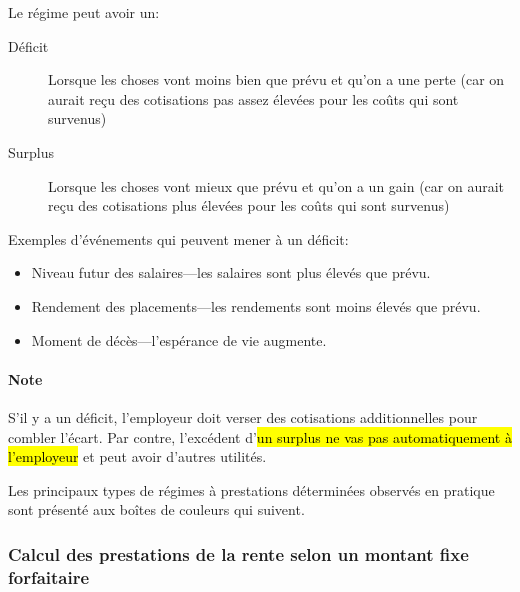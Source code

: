 \documentclass[10pt, french]{article}
\begin{document}
\begin{multicols*}{3}
\begin{definitionNOHFILLsub}
Le régime peut avoir un:
\begin{description}
	\item[Déficit]	Lorsque les choses vont moins bien que prévu et qu'on a une perte (car on aurait reçu des cotisations pas assez élevées pour les coûts qui sont survenus) 
	\item[Surplus]	Lorsque les choses vont mieux que prévu et qu'on a un gain (car on aurait reçu des cotisations plus élevées pour les coûts qui sont survenus) 
\end{description}

Exemples d'événements qui peuvent mener à un déficit:
\begin{itemize}[leftmargin = *]
	\item	Niveau futur des salaires---les salaires sont plus élevés que prévu.
	\item	Rendement des placements---les rendements sont moins élevés que prévu.
	\item	Moment de décès---l'espérance de vie augmente.
\end{itemize}


\paragraph{Note} S'il y a un déficit, l'employeur doit verser des cotisations additionnelles pour combler l'écart. Par contre, l'excédent d'\hl{un surplus ne vas pas automatiquement à l'employeur} et peut avoir d'autres utilités.
\end{definitionNOHFILLsub}

Les principaux types de régimes à prestations déterminées observés en pratique sont présenté aux boîtes de couleurs qui suivent. 

\subsubsection*{Calcul des prestations de la rente selon un montant fixe forfaitaire}


\end{multicols*}
\end{document}
